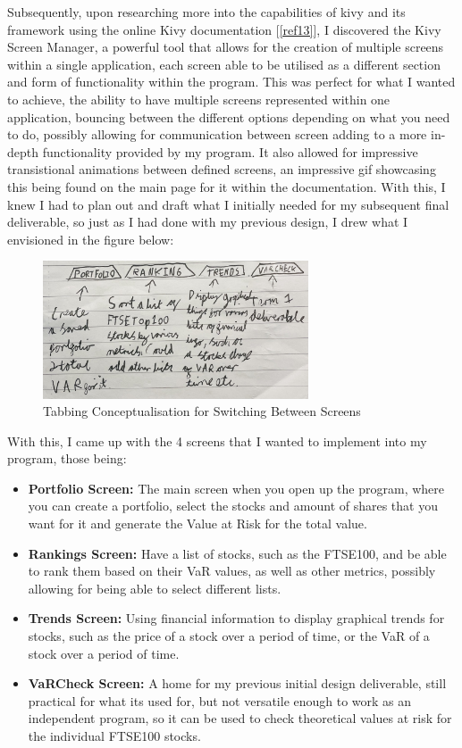\documentclass{article}
\begin{document}
Subsequently, upon researching more into the capabilities of kivy and its framework using the online Kivy documentation [\ref{ref13}], I discovered the Kivy Screen Manager, a powerful tool that allows for the creation of multiple screens within a single application, each screen able to be utilised as a different section and form of functionality within the program. This was perfect for what I wanted to achieve, the ability to have multiple screens represented within one application, bouncing between the different options depending on what you need to do, possibly allowing for communication between screen adding to a more in-depth functionality provided by my program. It also allowed for impressive transistional animations between defined screens, an impressive gif showcasing this being found on the main page for it within the documentation. With this, I knew I had to plan out and draft what I initially needed for my subsequent final deliverable, so just as I had done with my previous design, I drew what I envisioned in the figure below:\\\vspace{0.3cm}

\begin{figure}[h]
  \centering
  \includegraphics[width=0.7\textwidth]{Images/Term 2 Images/IMG_1346.jpg}
  \caption{Tabbing Conceptualisation for Switching Between Screens}
  \label{fig:Tabbing Concept}
\end{figure}

With this, I came up with the 4 screens that I wanted to implement into my program, those being:
\begin{itemize}
  \item \textbf{Portfolio Screen:} The main screen when you open up the program, where you can create a portfolio, select the stocks and amount of shares that you want for it and generate the Value at Risk for the total value.
  \item \textbf{Rankings Screen:} Have a list of stocks, such as the FTSE100, and be able to rank them based on their VaR values, as well as other metrics, possibly allowing for being able to select different lists.
  \item \textbf{Trends Screen:} Using financial information to display graphical trends for stocks, such as the price of a stock over a period of time, or the VaR of a stock over a period of time.
  \item \textbf{VaRCheck Screen:} A home for my previous initial design deliverable, still practical for what its used for, but not versatile enough to work as an independent program, so it can be used to check theoretical values at risk for the individual FTSE100 stocks.
\end{itemize}
\end{document}

